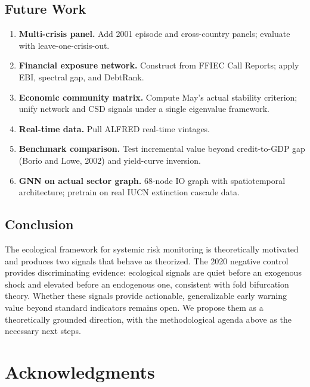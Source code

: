 \documentclass[12pt,a4paper]{article}
\begin{document}
\subsection{Future Work}

\begin{enumerate}
\item \textbf{Multi-crisis panel.} Add 2001 episode and cross-country panels;
evaluate with leave-one-crisis-out.

\item \textbf{Financial exposure network.} Construct from FFIEC Call Reports;
apply EBI, spectral gap, and DebtRank.

\item \textbf{Economic community matrix.} Compute May's actual stability criterion;
unify network and CSD signals under a single eigenvalue framework.

\item \textbf{Real-time data.} Pull ALFRED real-time vintages.

\item \textbf{Benchmark comparison.} Test incremental value beyond credit-to-GDP
gap (Borio and Lowe, 2002) and yield-curve inversion.

\item \textbf{GNN on actual sector graph.} 68-node IO graph with spatiotemporal
architecture; pretrain on real IUCN extinction cascade data.
\end{enumerate}

\subsection{Conclusion}

The ecological framework for systemic risk monitoring is theoretically motivated and
produces two signals that behave as theorized. The 2020 negative control provides
discriminating evidence: ecological signals are quiet before an exogenous shock and
elevated before an endogenous one, consistent with fold bifurcation theory. Whether
these signals provide actionable, generalizable early warning value beyond standard
indicators remains open. We propose them as a theoretically grounded direction, with
the methodological agenda above as the necessary next steps.

\section*{Acknowledgments}
\end{document}

